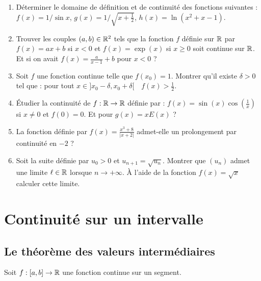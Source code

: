 \documentclass[class=report,crop=false]{standalone}
\begin{document}
\begin{miniexercices}
\sauteligne
\begin{enumerate}
  \item Déterminer le domaine de définition et de continuité des fonctions suivantes :
$f(x) = 1/\sin x$, $g(x) = 1/\sqrt{x+\frac12}$, $h(x) = \ln(x^2+x-1)$.

  \item Trouver les couples $(a,b)\in\mathbb{R}^2$ tels que la fonction $f$ définie sur $\mathbb{R}$ par
  $f(x) = ax+b$ si $x< 0$ et $f(x) = \exp(x)$  si $x\geq 0$ soit continue sur $\mathbb{R}$.
  Et si on avait $f(x) = \frac{a}{x-1}+b$ pour $x<0$ ?

  \item Soit $f$ une fonction continue telle que $f(x_0)=1$. Montrer qu'il existe $\delta>0$ tel que :
  pour tout $x\in ]x_0 - \delta, x_0+\delta[ \quad f(x) > \frac12$.

  \item \'Etudier la continuité de $f : \mathbb{R} \to \mathbb{R}$ définie par :
  $f(x) = \sin(x)\cos\left(\frac1x\right)$ si $x\neq 0$ et $f(0)=0$. Et pour $g(x)=xE(x)$ ?

  \item La fonction définie par $f(x)=\frac{x^3+8}{|x+2|}$ admet-elle
  un prolongement par continuité en $-2$ ?

  \item Soit la suite définie par $u_0>0$ et $u_{n+1}=\sqrt{u_n}$. Montrer que $(u_n)$
  admet une limite $\ell \in \mathbb{R}$ lorsque $n\to+\infty$. \`A l'aide de la fonction
  $f(x)=\sqrt{x}$ calculer cette limite.
\end{enumerate}
\end{miniexercices}


\section{Continuité sur un intervalle}

\subsection{Le théorème des valeurs intermédiaires}

\begin{theoreme}
Soit $f:[a,b]\to\mathbb{R}$ une fonction continue sur un segment.
\end{theoreme}
\end{document}
